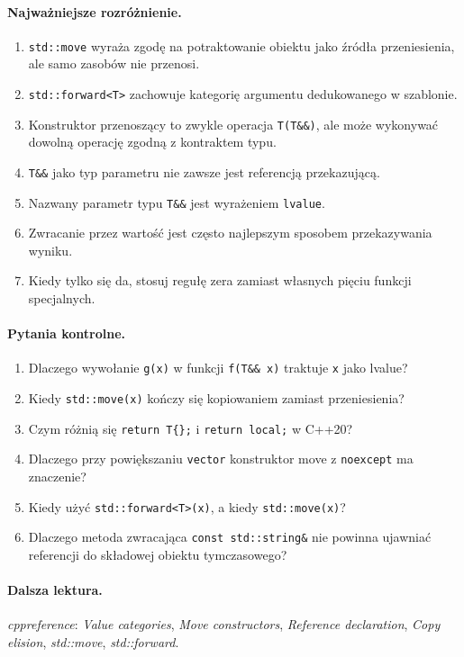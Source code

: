 \paragraph{Najważniejsze rozróżnienie.}
\begin{enumerate}
\item \texttt{std::move} wyraża zgodę na potraktowanie obiektu jako źródła przeniesienia, ale samo zasobów nie przenosi.
\item \texttt{std::forward<T>} zachowuje kategorię argumentu dedukowanego w szablonie.
\item Konstruktor przenoszący to zwykle operacja \texttt{T(T\&\&)}, ale może wykonywać dowolną operację zgodną z kontraktem typu.
\item \texttt{T\&\&} jako typ parametru nie zawsze jest referencją przekazującą.
\item Nazwany parametr typu \texttt{T\&\&} jest wyrażeniem \texttt{lvalue}.
\item Zwracanie przez wartość jest często najlepszym sposobem przekazywania wyniku.
\item Kiedy tylko się da, stosuj regułę zera zamiast własnych pięciu funkcji specjalnych.
\end{enumerate}

\paragraph{Pytania kontrolne.}
\begin{enumerate}
\item Dlaczego wywołanie \texttt{g(x)} w funkcji \texttt{f(T\&\& x)} traktuje \texttt{x} jako lvalue?
\item Kiedy \texttt{std::move(x)} kończy się kopiowaniem zamiast przeniesienia?
\item Czym różnią się \texttt{return T\{\};} i \texttt{return local;} w C++20?
\item Dlaczego przy powiększaniu \texttt{vector} konstruktor move z \texttt{noexcept} ma znaczenie?
\item Kiedy użyć \texttt{std::forward<T>(x)}, a kiedy \texttt{std::move(x)}?
\item Dlaczego metoda zwracająca \texttt{const std::string\&} nie powinna ujawniać referencji do składowej obiektu tymczasowego?
\end{enumerate}

\paragraph{Dalsza lektura.} \emph{cppreference}: \textit{Value categories},
\textit{Move constructors}, \textit{Reference declaration},
\textit{Copy elision}, \textit{std::move}, \textit{std::forward}.
